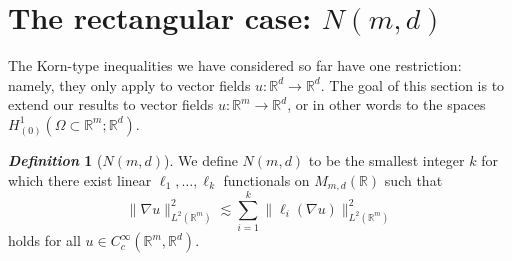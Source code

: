 \documentclass[11pt, a4paper, reqno]{elsarticle}
\theoremstyle{definition}
\newtheorem{definition}{\textsl{Definition}}
\theoremstyle{remark}
\begin{document}
\section{The rectangular case: \texorpdfstring{$N(m,d)$}{N(m,d)}}\label{sec : rect}
The Korn-type inequalities
we have considered so far
have one restriction: namely, they only
apply to vector fields $u\colon \mathbb{R}^d\to \mathbb{R}^d$.
The goal of this section is to extend
our results to vector fields $u\colon \mathbb{R}^m\to \mathbb{R}^d$, or in other words to the spaces
$H^1_{(0)}(\Omega\subset \mathbb{R}^m; \mathbb{R}^d)$.
\begin{definition}[$N(m,d)$]
    We define $N(m,d)$ to be
the smallest integer $k$ for which
there exist linear $\ell_1,\dots, \ell_k$ functionals on $M_{m,d}(\mathbb{R})$
such that
\begin{equation}
	\label{eq : Nmddef}
	\|\nabla u\|_{L^2(\mathbb{R}^m)}^2
\lesssim
	\sum_{i=1}^k \|\ell_i(\nabla u)\|_{L^2(\mathbb{R}^m)}^2
\end{equation}
holds for all $u\in C^\infty_c(\mathbb R^m,\mathbb{R}^d)$.
\end{definition}
\end{document}

